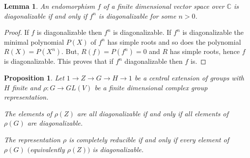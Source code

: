 \documentclass[12pt, reqno]{amsart}
\newtheorem{proposition}[theorem]{Proposition}
\newtheorem{lemma}[theorem]{Lemma}
\begin{document}
\begin{lemma}\label{power}
An endomorphism $f$ of a finite dimensional vector space over $\mathbb{C}$ is diagonalizable if and only if $f^n$ is diagonalizable for some $n>0$.
\end{lemma}
\begin{proof}
If $f$ is diagonalizable then $f^n$ is diagonalizable. If $f^n$ is diagonalizable the minimal polynomial $P(X)$ of $f^n$ has simple roots and so does the polynomial $R(X)=P(X^n)$. But, $R(f)=P(f^n)=0$ and $R$ has simple roots, hence $f$ is diagonalizable. This proves that if $f^n$ diagonalizable then $f$ is.
\end{proof}

\begin{proposition}\label{dec}
Let $1\to Z \to G \to H\to 1$ be a central extension of groups with $H$ finite and $\rho :G\to GL(V)$ be a finite dimensional complex group representation.
\item[1)] The elements of $\rho(Z)$ are all diagonalizable if and only if all elements of $\rho(G)$ are diagonalizable.
\item[2)] The representation $\rho$ is completely reducible if and only if every element of $\rho(G)$ $($equivalently $\rho(Z)$$)$ is diagonalizable.
\end{proposition}
\end{document}

